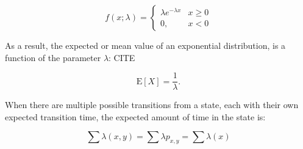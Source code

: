 \begin{equation}
f(x;\lambda) = \begin{cases}
\lambda e^{-\lambda x} & x \ge 0 \\
0, & x < 0
\end{cases}
\end{equation}

As a result, the expected or mean value of an exponential distribution, is a function of
the parameter $\lambda$: CITE

\begin{equation}
\mathrm{E}[X] = \frac{1}{\lambda}. \!
\end{equation}

When there are multiple possible transitions from a state, each with their own
expected transition time, the expected amount of time in the state is:

\begin{equation}
\sum \lambda(x,y) = \sum \lambda p_{x,y} = \sum \lambda(x)
\end{equation}

